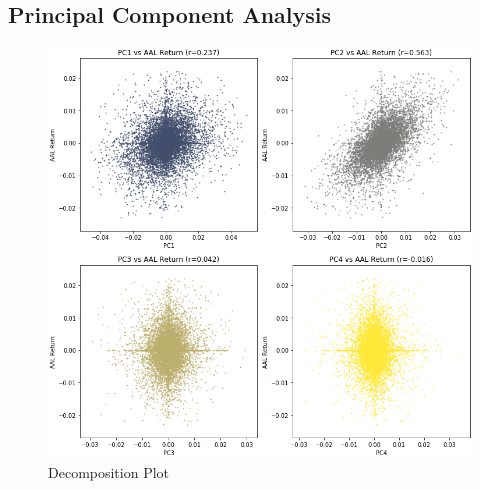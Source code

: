 \documentclass{article}
\begin{document}
\subsection{Principal Component Analysis}
\begin{figure}[h!]
  \centering
    \includegraphics[width=.8\linewidth]{../Figures/PCA_plot.png}
    \caption{Decomposition Plot}
\end{figure}
\end{document}

